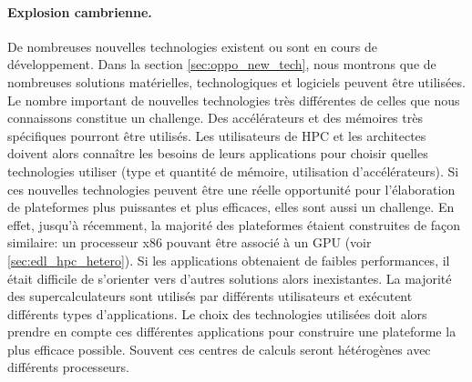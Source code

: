         
        
    
        \paragraph{Explosion cambrienne.} De nombreuses nouvelles technologies existent ou sont en cours de développement. Dans la section \autoref{sec:oppo_new_tech}, nous montrons que de nombreuses solutions matérielles, technologiques et logiciels peuvent être utilisées. Le nombre important de nouvelles technologies très différentes de celles que nous connaissons constitue un challenge. Des accélérateurs et des mémoires très spécifiques pourront être utilisés. Les utilisateurs de HPC et les architectes doivent alors connaître les besoins de leurs applications pour choisir quelles technologies utiliser (type et quantité de mémoire, utilisation d'accélérateurs). Si ces nouvelles technologies peuvent être une réelle opportunité pour l'élaboration de plateformes plus puissantes et plus efficaces, elles sont aussi un challenge. En effet, jusqu’à récemment, la majorité des plateformes étaient construites de façon similaire: un processeur x86 pouvant être associé à un GPU (voir \autoref{sec:edl_hpc_hetero}). Si les applications obtenaient de faibles performances, il était difficile de s'orienter vers d'autres solutions alors inexistantes. La majorité des supercalculateurs sont utilisés par différents utilisateurs et exécutent différents types d'applications. Le choix des technologies utilisées doit alors prendre en compte ces différentes applications pour construire une plateforme la plus efficace possible. Souvent ces centres de calculs seront hétérogènes avec différents processeurs.
        
